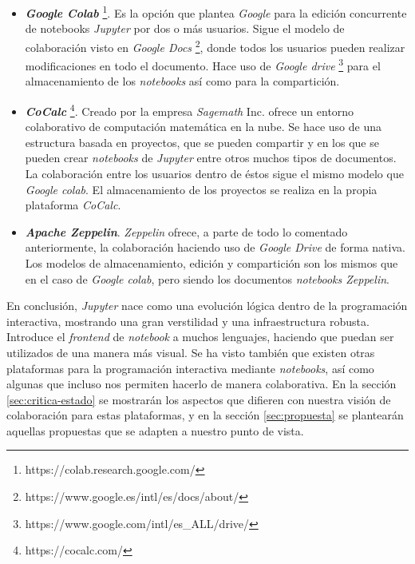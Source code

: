 \documentclass[11pt,spanish,listoffigures]{tfgetsinf}
\begin{document}
\begin{itemize}

\item \textbf{\textit{Google Colab}} \footnote{https://colab.research.google.com/}. Es la opción que plantea \textit{Google} para la edición concurrente de notebooks \textit{Jupyter} por dos o más usuarios. Sigue el modelo de colaboración visto en \textit{Google Docs} \footnote{https://www.google.es/intl/es/docs/about/}, donde todos los usuarios pueden realizar modificaciones en todo el documento. Hace uso de \textit{Google drive} \footnote{https://www.google.com/intl/es\_ALL/drive/} para el almacenamiento de los \textit{notebooks} así como para la compartición.

\item \textbf{\textit{CoCalc}} \footnote{https://cocalc.com/}. Creado por la empresa \textit{Sagemath} Inc. ofrece un entorno colaborativo de computación matemática en la nube. Se hace uso de una estructura basada en proyectos, que se pueden compartir y en los que se pueden crear \textit{notebooks} de \textit{Jupyter} entre otros muchos tipos de documentos. La colaboración entre los usuarios dentro de éstos sigue el mismo modelo que \textit{Google colab}. El almacenamiento de los proyectos se realiza en la propia plataforma \textit{CoCalc}.

\item \textbf{\textit{Apache Zeppelin}}. \textit{Zeppelin} ofrece, a parte de todo lo comentado anteriormente, la colaboración haciendo uso de \textit{Google Drive} de forma nativa. Los modelos de almacenamiento, edición y compartición son los mismos que en el caso de \textit{Google colab}, pero siendo los documentos \textit{notebooks Zeppelin}.

\end{itemize}

En conclusión, \textit{Jupyter} nace como una evolución lógica dentro de la programación interactiva, mostrando una gran verstilidad y una infraestructura robusta. Introduce el \textit{frontend} de \textit{notebook} a muchos lenguajes, haciendo que puedan ser utilizados de una manera más visual. Se ha visto también que existen otras plataformas para la programación interactiva mediante \textit{notebooks}, así como algunas que incluso nos permiten hacerlo de manera colaborativa. En la sección \ref{sec:critica-estado} se mostrarán los aspectos que difieren con nuestra visión de colaboración para estas plataformas, y en la sección  \ref{sec:propuesta} se plantearán aquellas propuestas que se adapten a nuestro punto de vista.
\end{document}
